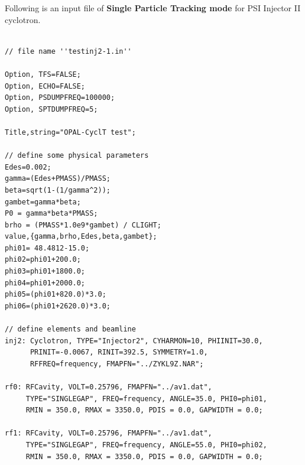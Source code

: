 Following is an input file of {\bfseries Single Particle Tracking mode} for PSI Injector II cyclotron.
\begin{fmpage}
\begin{footnotesize}
\begin{verbatim}

// file name ''testinj2-1.in''

Option, TFS=FALSE;
Option, ECHO=FALSE;
Option, PSDUMPFREQ=100000;
Option, SPTDUMPFREQ=5;

Title,string="OPAL-CyclT test";

// define some physical parameters 
Edes=0.002;
gamma=(Edes+PMASS)/PMASS;
beta=sqrt(1-(1/gamma^2));
gambet=gamma*beta;
P0 = gamma*beta*PMASS;
brho = (PMASS*1.0e9*gambet) / CLIGHT;
value,{gamma,brho,Edes,beta,gambet};
phi01= 48.4812-15.0;
phi02=phi01+200.0;
phi03=phi01+1800.0;
phi04=phi01+2000.0;
phi05=(phi01+820.0)*3.0;
phi06=(phi01+2620.0)*3.0;

// define elements and beamline
inj2: Cyclotron, TYPE="Injector2", CYHARMON=10, PHIINIT=30.0, 
      PRINIT=-0.0067, RINIT=392.5, SYMMETRY=1.0, 
      RFFREQ=frequency, FMAPFN="../ZYKL9Z.NAR";

rf0: RFCavity, VOLT=0.25796, FMAPFN="../av1.dat", 
     TYPE="SINGLEGAP", FREQ=frequency, ANGLE=35.0, PHI0=phi01,
     RMIN = 350.0, RMAX = 3350.0, PDIS = 0.0, GAPWIDTH = 0.0; 

rf1: RFCavity, VOLT=0.25796, FMAPFN="../av1.dat", 
     TYPE="SINGLEGAP", FREQ=frequency, ANGLE=55.0, PHI0=phi02, 
     RMIN = 350.0, RMAX = 3350.0, PDIS = 0.0, GAPWIDTH = 0.0; 
\end{verbatim}
\end{footnotesize}
\end{fmpage}
